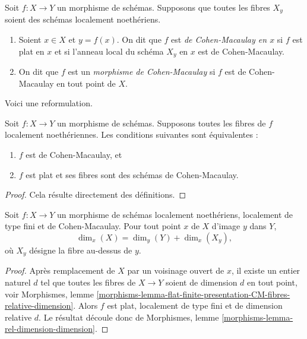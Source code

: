 \begin{definition}
\label{definition-CM}
Soit $f : X \to Y$ un morphisme de schémas.
Supposons que toutes les fibres $X_y$ soient des schémas localement noethériens.
\begin{enumerate}
\item Soient $x \in X$ et $y = f(x)$. On dit que $f$ est
{\it de Cohen-Macaulay en $x$} si $f$ est plat en $x$ et si
l'anneau local du schéma $X_y$ en $x$ est de Cohen-Macaulay.
\item On dit que $f$ est un {\it morphisme de Cohen-Macaulay} si $f$ est
de Cohen-Macaulay en tout point de $X$.
\end{enumerate}
\end{definition}

\noindent
Voici une reformulation.

\begin{lemma}
\label{lemma-CM}
Soit $f : X \to Y$ un morphisme de schémas.
Supposons toutes les fibres de $f$ localement noethériennes.
Les conditions suivantes sont équivalentes :
\begin{enumerate}
\item $f$ est de Cohen-Macaulay, et
\item $f$ est plat et ses fibres sont des schémas de Cohen-Macaulay.
\end{enumerate}
\end{lemma}

\begin{proof}
Cela résulte directement des définitions.
\end{proof}

\begin{lemma}
\label{lemma-CM-dimension}
Soit $f : X \to Y$ un morphisme de schémas localement noethériens,
localement de type fini et de Cohen-Macaulay.
Pour tout point $x$ de $X$ d'image $y$ dans $Y$,
$$
\dim_x(X) = \dim_y(Y) + \dim_x(X_y),
$$
où $X_y$ désigne la fibre au-dessus de $y$.
\end{lemma}

\begin{proof}
Après remplacement de $X$ par un voisinage ouvert de $x$,
il existe un entier naturel $d$ tel que toutes les fibres
de $X \to Y$ soient de dimension $d$ en tout point, voir
Morphismes, lemme
\ref{morphisms-lemma-flat-finite-presentation-CM-fibres-relative-dimension}.
Alors $f$ est plat, localement de type fini
et de dimension relative $d$. Le résultat découle donc de
Morphismes, lemme \ref{morphisms-lemma-rel-dimension-dimension}.
\end{proof}

